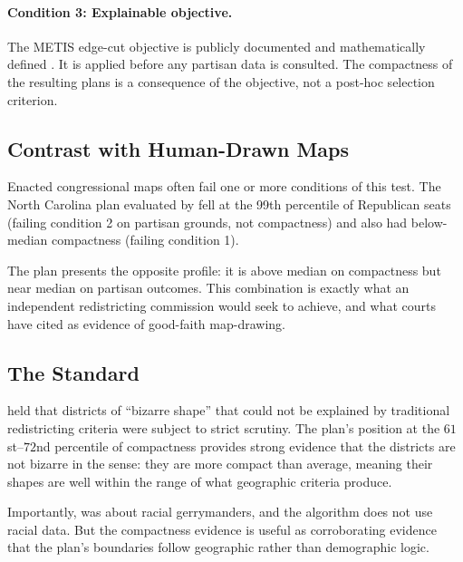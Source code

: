 \paragraph{Condition 3: Explainable objective.}
The METIS edge-cut objective is publicly documented and mathematically
defined \citep{karypis1998fast}.  It is applied before any partisan data
is consulted.  The compactness of the resulting plans is a consequence
of the objective, not a post-hoc selection criterion.

\subsection{Contrast with Human-Drawn Maps}

Enacted congressional maps often fail one or more conditions of this test.
The North Carolina plan evaluated by \citet{herschlag2020quantifying} fell
at the 99th percentile of Republican seats (failing condition 2 on partisan
grounds, not compactness) and also had below-median compactness (failing
condition 1).

The \ar{} plan presents the opposite profile: it is above median on
compactness but near median on partisan outcomes.  This combination is
exactly what an independent redistricting commission would seek to achieve,
and what courts have cited as evidence of good-faith map-drawing.

\subsection{The \texorpdfstring{\shaw{}}{Shaw} Standard}

\shaw{} held that districts of ``bizarre shape'' that could not be explained
by traditional redistricting criteria were subject to strict scrutiny.  The
\ar{} plan's position at the $61$st--$72$nd percentile of compactness
provides strong evidence that the districts are not bizarre in the \shaw{}
sense: they are more compact than average, meaning their shapes are well
within the range of what geographic criteria produce.

Importantly, \shaw{} was about racial gerrymanders, and the \ar{} algorithm
does not use racial data.  But the compactness evidence is useful as
corroborating evidence that the plan's boundaries follow geographic rather
than demographic logic.
